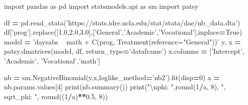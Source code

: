 \documentclass[polish,]{book}
\newenvironment{Shaded}{\begin{snugshade}}{\end{snugshade}}
\newcommand{\BuiltInTok}[1]{#1}
\newcommand{\CharTok}[1]{\textcolor[rgb]{0.31,0.60,0.02}{#1}}
\newcommand{\DecValTok}[1]{\textcolor[rgb]{0.00,0.00,0.81}{#1}}
\newcommand{\FloatTok}[1]{\textcolor[rgb]{0.00,0.00,0.81}{#1}}
\newcommand{\ImportTok}[1]{#1}
\newcommand{\NormalTok}[1]{#1}
\newcommand{\OperatorTok}[1]{\textcolor[rgb]{0.81,0.36,0.00}{\textbf{#1}}}
\newcommand{\StringTok}[1]{\textcolor[rgb]{0.31,0.60,0.02}{#1}}
\newcommand{\VariableTok}[1]{\textcolor[rgb]{0.00,0.00,0.00}{#1}}
\begin{document}
\begin{Shaded}
\begin{Highlighting}[]
\ImportTok{import}\NormalTok{ pandas }\ImportTok{as}\NormalTok{ pd}
\ImportTok{import}\NormalTok{ statsmodels.api }\ImportTok{as}\NormalTok{ sm}
\ImportTok{import}\NormalTok{ patsy}
                  
\NormalTok{df }\OperatorTok{=}\NormalTok{ pd.read_stata(}\StringTok{'https://stats.idre.ucla.edu/stat/stata/dae/nb_data.dta'}\NormalTok{)}
\NormalTok{df[}\StringTok{'prog'}\NormalTok{].replace([}\FloatTok{1.0}\NormalTok{,}\FloatTok{2.0}\NormalTok{,}\FloatTok{3.0}\NormalTok{],[}\StringTok{'General'}\NormalTok{,}\StringTok{'Academic'}\NormalTok{,}\StringTok{'Vocational'}\NormalTok{],inplace}\OperatorTok{=}\VariableTok{True}\NormalTok{)}
\NormalTok{model }\OperatorTok{=} \StringTok{'daysabs ~ math + C(prog, Treatment(reference="General"))'}
\NormalTok{y, x }\OperatorTok{=}\NormalTok{ patsy.dmatrices(model, df, return_type}\OperatorTok{=}\StringTok{'dataframe'}\NormalTok{)}
\NormalTok{x.columns }\OperatorTok{=}\NormalTok{ [}\StringTok{'Intercept'}\NormalTok{, }\StringTok{'Academic'}\NormalTok{, }\StringTok{'Vocational'}\NormalTok{,}\StringTok{'math'}\NormalTok{]}
    
\NormalTok{nb }\OperatorTok{=}\NormalTok{ sm.NegativeBinomial(y,x,loglike_method}\OperatorTok{=}\StringTok{'nb2'}\NormalTok{).fit(disp}\OperatorTok{=}\DecValTok{0}\NormalTok{)}
\NormalTok{a }\OperatorTok{=}\NormalTok{ nb.params.values[}\DecValTok{4}\NormalTok{]}
\BuiltInTok{print}\NormalTok{(nb.summary())}
\BuiltInTok{print}\NormalTok{(}\StringTok{"}\CharTok{\textbackslash{}n}\StringTok{phi: "}\NormalTok{,}\BuiltInTok{round}\NormalTok{(}\DecValTok{1}\OperatorTok{/}\NormalTok{a, }\DecValTok{8}\NormalTok{), }\StringTok{", sqrt_phi: "}\NormalTok{, }\BuiltInTok{round}\NormalTok{((}\DecValTok{1}\OperatorTok{/}\NormalTok{a)}\OperatorTok{**}\FloatTok{0.5}\NormalTok{, }\DecValTok{8}\NormalTok{))}
\end{Highlighting}
\end{Shaded}
\end{document}
